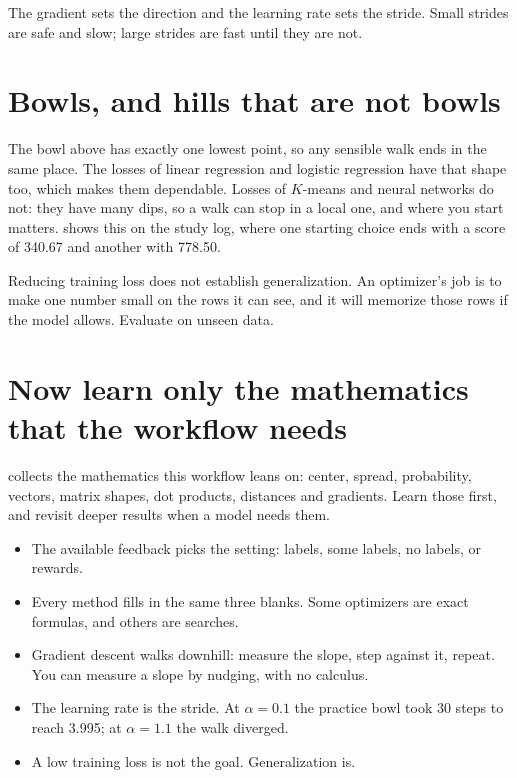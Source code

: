 \begin{intuition}
The gradient sets the direction and the learning rate sets the stride. Small strides are safe and slow; large strides are fast until they are not.
\end{intuition}

\section{Bowls, and hills that are not bowls}

The bowl above has exactly one lowest point, so any sensible walk ends in the same place. The losses of linear regression and logistic regression have that shape too, which makes them dependable. Losses of $K$-means and neural networks do not: they have many dips, so a walk can stop in a local one, and where you start matters.  shows this on the study log, where one starting choice ends with a score of 340.67 and another with 778.50.

\begin{keyidea}
Reducing training loss does not establish generalization. An optimizer's job is to make one number small on the rows it can see, and it will memorize those rows if the model allows. Evaluate on unseen data.
\end{keyidea}

\section{Now learn only the mathematics that the workflow needs}

 collects the mathematics this workflow leans on: center, spread, probability, vectors, matrix shapes, dot products, distances and gradients. Learn those first, and revisit deeper results when a model needs them.

\begin{chapterrecap}
\begin{itemize}
  \item The available feedback picks the setting: labels, some labels, no labels, or rewards.
  \item Every method fills in the same three blanks. Some optimizers are exact formulas, and others are searches.
  \item Gradient descent walks downhill: measure the slope, step against it, repeat. You can measure a slope by nudging, with no calculus.
  \item The learning rate is the stride. At $\alpha=0.1$ the practice bowl took 30 steps to reach 3.995; at $\alpha=1.1$ the walk diverged.
  \item A low training loss is not the goal. Generalization is.
\end{itemize}
\end{chapterrecap}

